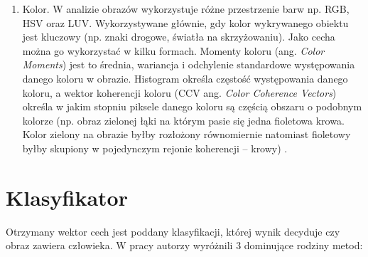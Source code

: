 \begin{enumerate}
\item Kolor. W analizie obrazów wykorzystuje różne przestrzenie barw np. RGB, HSV oraz LUV. Wykorzystywane głównie, gdy kolor wykrywanego obiektu jest kluczowy (np. znaki drogowe, światła na skrzyżowaniu). Jako cecha można go wykorzystać w kilku formach. Momenty koloru (ang. \textit{Color Moments}) jest to średnia, wariancja i odchylenie standardowe występowania danego koloru w obrazie. Histogram określa częstość występowania danego koloru, a wektor koherencji koloru (CCV ang. \textit{ Color Coherence Vectors}) określa w jakim stopniu piksele danego koloru są częścią obszaru o podobnym kolorze (np. obraz zielonej łąki na którym pasie się jedna fioletowa krowa. Kolor zielony na obrazie byłby rozłożony równomiernie natomiast fioletowy byłby skupiony w pojedynczym rejonie koherencji -- krowy) \cite{kodituwakku2004comparison}.

\end{enumerate}

\section{Klasyfikator}
Otrzymany wektor cech jest poddany klasyfikacji, której wynik decyduje czy obraz zawiera człowieka.
W pracy \cite{benenson2014ten} autorzy wyróżnili 3 dominujące rodziny metod:

